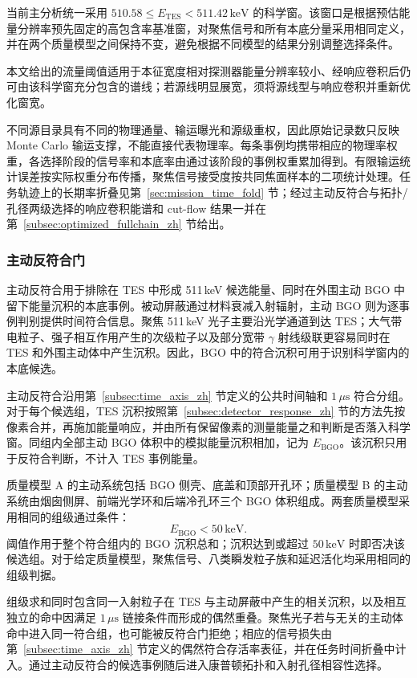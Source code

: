 \documentclass[11pt]{article}
\newcommand{\revblue}[1]{\textcolor{revisionblue}{#1}}
\newcommand{\keV}{\,\mathrm{keV}}
\begin{document}
当前主分析统一采用 $510.58\le E_{\mathrm{TES}}<511.42\keV$ 的科学窗。该窗口是根据预估能量分辨率预先固定的高包含率基准窗，对聚焦信号和所有本底分量采用相同定义，并在两个质量模型之间保持不变，避免根据不同模型的结果分别调整选择条件。

本文给出的流量阈值适用于本征宽度相对探测器能量分辨率较小、经响应卷积后仍可由该科学窗充分包含的谱线；若源线明显展宽，须将源线型与响应卷积并重新优化窗宽。

不同源目录具有不同的物理通量、输运曝光和源级重权，因此原始记录数只反映 Monte Carlo 输运支撑，不能直接代表物理率。每条事例均携带相应的物理率权重，各选择阶段的信号率和本底率由通过该阶段的事例权重累加得到。有限输运统计误差按实际权重分布传播，聚焦信号接受度按共同焦面样本的二项统计处理。任务轨迹上的长期率折叠见第~\ref{sec:mission_time_fold} 节；经过主动反符合与拓扑/孔径两级选择的响应卷积能谱和 cut-flow 结果一并在第~\ref{subsec:optimized_fullchain_zh} 节给出。

\subsubsection{主动反符合门}

主动反符合用于排除在 TES 中形成 511\,keV 候选能量、同时在外围主动 BGO 中留下能量沉积的本底事例。被动屏蔽通过材料衰减入射辐射，主动 BGO 则为逐事例判别提供时间符合信息。聚焦 511\,keV 光子主要沿光学通道到达 TES；大气带电粒子、强子相互作用产生的次级粒子以及部分宽带 $\gamma$ 射线级联更容易同时在 TES 和外围主动体中产生沉积。因此，BGO 中的符合沉积可用于识别科学窗内的本底候选。

主动反符合沿用第~\ref{subsec:time_axis_zh} 节定义的公共时间轴和 $1\,\mu\mathrm{s}$ 符合分组。对于每个候选组，TES 沉积按照第~\ref{subsec:detector_response_zh} 节的方法先按像素合并，再施加能量响应，并由所有保留像素的测量能量之和判断是否落入科学窗。同组内全部主动 BGO 体积中的模拟能量沉积相加，记为 $E_{\mathrm{BGO}}$。该沉积只用于反符合判断，不计入 TES 事例能量。

质量模型 A 的主动系统包括 BGO 侧壳、底盖和顶部开孔环；质量模型 B 的主动系统由烟囱侧屏、前端光学环和后端冷孔环三个 BGO 体积组成。两套质量模型采用相同的组级通过条件：
\[
 E_{\mathrm{BGO}}<50\keV .
\]
阈值作用于整个符合组内的 BGO 沉积总和；沉积达到或超过 $50\keV$ 时即否决该候选组。对于给定质量模型，聚焦信号、\revblue{八类瞬发粒子族和延迟活化}均采用相同的组级判据。

组级求和同时包含同一入射粒子在 TES 与主动屏蔽中产生的相关沉积，以及相互独立的命中因满足 $1\,\mu\mathrm{s}$ 链接条件而形成的偶然重叠。聚焦光子若与无关的主动体命中进入同一符合组，也可能被反符合门拒绝；相应的信号损失由第~\ref{subsec:time_axis_zh} 节定义的偶然符合存活率表征，并在任务时间折叠中计入。通过主动反符合的候选事例随后进入康普顿拓扑和入射孔径相容性选择。
\end{document}
